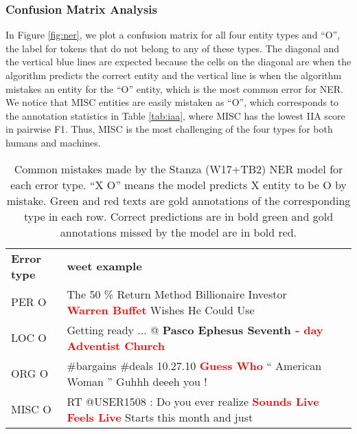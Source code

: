 \documentclass[10pt, a4paper]{article}
\begin{document}
\subsubsection{Confusion Matrix Analysis}
In Figure \ref{fig:ner}, we plot a confusion matrix for all four entity types and ``O'', the label for tokens that do not belong to any of these types.  The diagonal and the vertical blue lines are expected because the cells on the diagonal are when the algorithm predicts the correct entity and the vertical line is when the algorithm mistakes an entity for the ``O'' entity, which is the most common error for NER. We notice that MISC entities are easily mistaken as ``O'', which corresponds to the annotation statistics in Table \ref{tab:iaa}, where MISC has the lowest IIA score in pairwise F1. Thus, MISC is the most challenging of the four types for both humans and machines. 


\begin{table*}[ht]
\centering
\begin{tabular}{l|lll}
\textbf{Error type}                   & \textbf{ weet example} \\ \Xhline{2\arrayrulewidth} 
PER  O                & The 50 \% Return Method Billionaire Investor \textbf{\textcolor{red}{Warren Buffet}} Wishes He Could Use &  &  \\

LOC  O                & Getting ready ... @ \textbf{\textcolor{ao(english)}{Pasco Ephesus Seventh} \textcolor{red}{- day Adventist Church}}                       &  &   \\

ORG  O                & \#bargains \#deals 10.27.10 \textcolor{red}{\textbf{Guess Who}} `` American Woman '' Guhhh deeeh you !                             &  &   \\

MISC  O & RT @USER1508 : Do you ever realize \textcolor{red}{\textbf{Sounds Live Feels Live}} Starts this month and just                                       &  &   
\end{tabular}
\caption{Common mistakes made by the Stanza (W17+TB2) NER model for each error type. ``X  O'' means the model predicts X entity to be O by mistake. Green and red texts are gold annotations of the corresponding type in each row. Correct predictions are in bold green and gold annotations missed by the model are in bold red.}
\label{tab:examples}
\end{table*}
\end{document}
